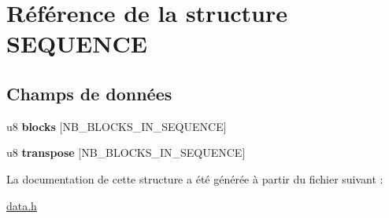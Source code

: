 \hypertarget{struct_s_e_q_u_e_n_c_e}{
\section{Référence de la structure SEQUENCE}
\label{struct_s_e_q_u_e_n_c_e}
}
\subsection*{Champs de données}
\begin{DoxyCompactItemize}
\item 
\hypertarget{struct_s_e_q_u_e_n_c_e_a3fdcd2dd1a30726b67f6e843572fc843}{
u8 {\bfseries blocks} \mbox{[}NB\_\-BLOCKS\_\-IN\_\-SEQUENCE\mbox{]}}
\label{struct_s_e_q_u_e_n_c_e_a3fdcd2dd1a30726b67f6e843572fc843}

\item 
\hypertarget{struct_s_e_q_u_e_n_c_e_a1a1289316feaf01165a558425cd0eb0e}{
u8 {\bfseries transpose} \mbox{[}NB\_\-BLOCKS\_\-IN\_\-SEQUENCE\mbox{]}}
\label{struct_s_e_q_u_e_n_c_e_a1a1289316feaf01165a558425cd0eb0e}

\end{DoxyCompactItemize}


La documentation de cette structure a été générée à partir du fichier suivant :\begin{DoxyCompactItemize}
\item 
\hyperlink{data_8h}{data.h}\end{DoxyCompactItemize}
